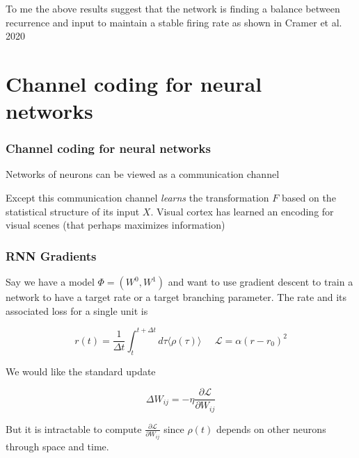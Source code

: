 \documentclass{beamer}
\begin{document}
\begin{frame}[plain]
\frametitle{} 

To me the above results suggest that the network is finding a balance between recurrence and input to maintain a stable firing rate as shown in Cramer et al. 2020

\end{frame}

\section{Channel coding for neural networks} 

\begin{frame}[plain]
\frametitle{Channel coding for neural networks} 

Networks of neurons can be viewed as a communication channel

Except this communication channel \emph{learns} the transformation $F$ based on the statistical structure of its input $X$. Visual cortex has learned an encoding for visual scenes (that perhaps maximizes information)

\end{frame}


\begin{frame}[plain]
\frametitle{RNN Gradients} 

Say we have a model $\Phi = (W^{0},W^{1})$ and want to use gradient descent to train a network to have a target rate or a target branching parameter. The rate and its associated loss for a single unit is

\begin{equation*}
r(t) = \frac{1}{\Delta t}\int_{t}^{t+\Delta t} d\tau \langle \rho(\tau)\rangle\;\;\;\;\;\mathcal{L} = \alpha(r-r_{0})^{2}
\end{equation*}

We would like the standard update 

\begin{equation*}
\Delta W_{ij} = -\eta \frac{\partial\mathcal{L}}{\partial W_{ij}}
\end{equation*}


But it is intractable to compute $\frac{\partial\mathcal{L}}{\partial W_{ij}}$ since $\rho(t)$ depends on other neurons through space and time.


\end{frame}
\end{document}
